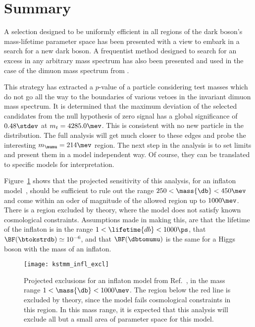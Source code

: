 \section{Summary}

A selection designed to be uniformly efficient in all regions of the dark boson's mass-lifetime
parameter space has been presented with a view to embark in a search for a new dark boson.
A frequentist method designed to search for an excess in any arbitrary mass spectrum has also been
presented and used in the case of the dimuon mass spectrum from \btokstrmumu.

This strategy has extracted a $p$-value of a particle considering test masses which do not go all
the way to the boundaries of various vetoes in the invariant dimuon mass spectrum.
It is determined that the maximum deviation of the selected candidates from the null hypothesis of
zero signal has a global significance of $0.48\stdev$ at $m_t = 4285.0\mev$.
This is consistent with no new particle in the \mumu distribution.
The full analysis will get much closer to these edges and probe the interesting $m_{\mumu}=214\mev$
region.
The next step in the analysis is to set limits and present them in a model independent way.
Of course, they can be translated to specific models for interpretation.


Figure~\ref{fig:db:excl:infl} shows that the projected
sensitivity of this analysis, for an inflaton model~\cite{Bezrukov:2014nza},
should be sufficient to rule out the range
$250<\mass{\db}<450\mev$ and come within an oder of magnitude of the allowed region up to
$1000\mev$.
There is a region excluded by theory, where the model does not satisfy known cosmological
constraints.
Assumptions made in making this, are that the lifetime of the inflaton is in the range
$1<\lifetime{db}<1000\ps$, that  $\BF(\btokstrdb)\simeq10^{-6}$, and that $\BF(\dbtomumu)$
is the same for a Higgs boson with the mass of an inflaton.

\begin{figure}
  \begin{center}
    \texttt{[image: kstmm\_infl\_excl]}
    \caption[Projected sensitivity in an inflaton search]
    {
      Projected exclusions for an inflaton model from Ref.~\protect\cite{Bezrukov:2014nza}, in the
      mass range $1<\mass{\db}<1000\mev$.
      The region below the red line is excluded by theory, since the model fails cosmological
      constraints in this region.
      In this mass range, it is expected that this analysis will exclude all but a small area of
      parameter space for this model.
    }
    \label{fig:db:excl:infl}
  \end{center}
\end{figure}

